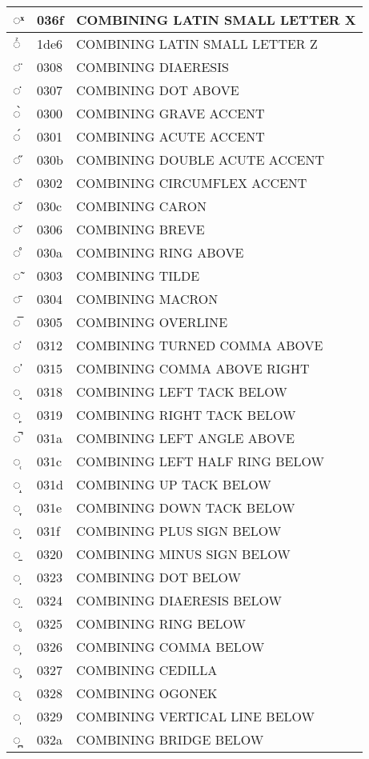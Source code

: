 \documentclass[12pt,letterpaper,openany]{book}
\begin{document}
\begin{center}
\begin{supertabular}{|m{0.25in}|m{0.5in}|m{4in}|}
◌ͯ & 036f & COMBINING LATIN SMALL LETTER X\\\hline
◌ᷦ & 1de6 & COMBINING LATIN SMALL LETTER Z\\\hline
◌̈ & 0308 & COMBINING DIAERESIS\\\hline
◌̇ & 0307 & COMBINING DOT ABOVE\\\hline
◌̀ & 0300 & COMBINING GRAVE ACCENT\\\hline
◌́ & 0301 & COMBINING ACUTE ACCENT\\\hline
◌̋ & 030b & COMBINING DOUBLE ACUTE ACCENT\\\hline
◌̂ & 0302 & COMBINING CIRCUMFLEX ACCENT\\\hline
◌̌ & 030c & COMBINING CARON\\\hline
◌̆ & 0306 & COMBINING BREVE\\\hline
◌̊ & 030a & COMBINING RING ABOVE\\\hline
◌̃ & 0303 & COMBINING TILDE\\\hline
◌̄ & 0304 & COMBINING MACRON\\\hline
◌̅ & 0305 & COMBINING OVERLINE\\\hline
◌̒ & 0312 & COMBINING TURNED COMMA ABOVE\\\hline
◌̕ & 0315 & COMBINING COMMA ABOVE RIGHT\\\hline
◌̘ & 0318 & COMBINING LEFT TACK BELOW\\\hline
◌̙ & 0319 & COMBINING RIGHT TACK BELOW\\\hline
◌̚ & 031a & COMBINING LEFT ANGLE ABOVE\\\hline
◌̜ & 031c & COMBINING LEFT HALF RING BELOW\\\hline
◌̝ & 031d & COMBINING UP TACK BELOW\\\hline
◌̞ & 031e & COMBINING DOWN TACK BELOW\\\hline
◌̟ & 031f & COMBINING PLUS SIGN BELOW\\\hline
◌̠ & 0320 & COMBINING MINUS SIGN BELOW\\\hline
◌̣ & 0323 & COMBINING DOT BELOW\\\hline
◌̤ & 0324 & COMBINING DIAERESIS BELOW\\\hline
◌̥ & 0325 & COMBINING RING BELOW\\\hline
◌̦ & 0326 & COMBINING COMMA BELOW\\\hline
◌̧ & 0327 & COMBINING CEDILLA\\\hline
◌̨ & 0328 & COMBINING OGONEK\\\hline
◌̩ & 0329 & COMBINING VERTICAL LINE BELOW\\\hline
◌̪ & 032a & COMBINING BRIDGE BELOW\\\hline

\end{supertabular}
\end{center}
\end{document}
